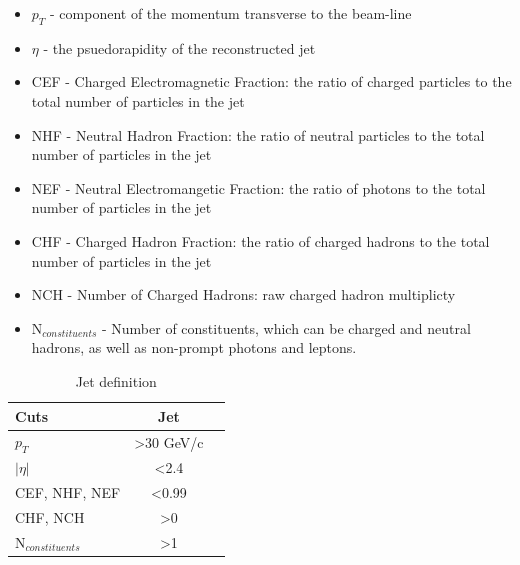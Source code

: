 \begin{itemize}
  \item $p_{T}$ - component of the momentum transverse to the
    beam-line
  \item $\eta$ - the psuedorapidity of the reconstructed jet
  \item CEF - Charged Electromagnetic Fraction: the ratio of
    charged particles to the total number of particles in the jet
  \item NHF - Neutral Hadron Fraction: the ratio of neutral
    particles to the total number of particles in the jet
  \item NEF -  Neutral Electromangetic Fraction: the ratio of
    photons to the total number of particles in the jet
  \item CHF - Charged Hadron Fraction: the ratio of charged hadrons to
    the total number of particles in the jet
  \item NCH - Number of Charged Hadrons: raw charged hadron multiplicty
  \item N$_{constituents}$ - Number of constituents, which can be charged
  and neutral hadrons, as well as non-prompt photons and leptons.  
\end{itemize}

\begin{table}[hbtp]\footnotesize
\centering
\begin{tabular}{|l|c|c|}
\hline\hline
Cuts & Jet  \\
\hline
$p_{T}$ & \textgreater 30 GeV/c  \\
\hline
$|\eta|$ & \textless 2.4 \\
\hline
CEF, NHF, NEF & \textless 0.99 \\
\hline
CHF, NCH & \textgreater 0 \\
\hline
N$_{constituents}$ & \textgreater 1 \\
\hline\hline
\end{tabular}
\caption{Jet definition}
\label{tab:JetTable}
\end{table} 

